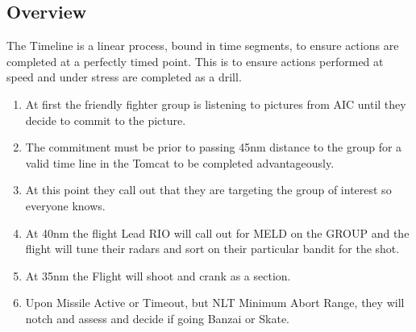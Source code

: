 
\subsection{Overview}



The Timeline is a linear process, bound in time segments, to ensure actions
are completed at a perfectly timed point. This is to ensure actions performed
at speed and under stress are completed as a drill.

\begin{enumerate}

  \item At first the friendly fighter group is listening to pictures from AIC
    until they decide to commit to the picture.

  \item The commitment must be prior to passing 45nm distance to the group for
    a valid time line in the Tomcat to be completed advantageously.

  \item At this point they call out that they are targeting the group of
    interest so everyone knows.

  \item At 40nm the flight Lead RIO will call out for MELD on the GROUP and the
    flight will tune their radars and sort on their particular bandit for the
    shot.

  \item At 35nm the Flight will shoot and crank as a section.

  \item Upon Missile Active or Timeout, but NLT Minimum Abort Range, they will
    notch and assess and decide if going Banzai or Skate.

\end{enumerate}
